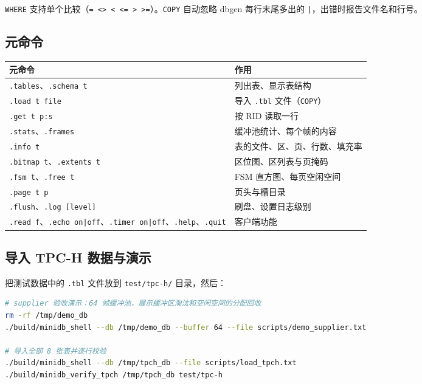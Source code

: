\documentclass[11pt,a4paper]{ctexart}
\newcommand{\code}[1]{\texttt{#1}}
\begin{document}
\code{WHERE} 支持单个比较（\code{= <> < <= > >=}）。\code{COPY} 自动忽略 dbgen 每行末尾多出的 \code{|}，出错时报告文件名和行号。

\subsection{元命令}

\begin{table}[H]
  \centering
  \small
  \begin{tabular}{l l}
    \toprule
    元命令 & 作用 \\
    \midrule
    \code{.tables}、\code{.schema t} & 列出表、显示表结构 \\
    \code{.load t file} & 导入 \code{.tbl} 文件（\code{COPY}） \\
    \code{.get t p:s} & 按 RID 读取一行 \\
    \code{.stats}、\code{.frames} & 缓冲池统计、每个帧的内容 \\
    \code{.info t} & 表的文件、区、页、行数、填充率 \\
    \code{.bitmap t}、\code{.extents t} & 区位图、区列表与页掩码 \\
    \code{.fsm t}、\code{.free t} & FSM 直方图、每页空闲空间 \\
    \code{.page t p} & 页头与槽目录 \\
    \code{.flush}、\code{.log [level]} & 刷盘、设置日志级别 \\
    \code{.read f}、\code{.echo on|off}、\code{.timer on|off}、\code{.help}、\code{.quit} & 客户端功能 \\
    \bottomrule
  \end{tabular}
\end{table}

\subsection{导入 TPC-H 数据与演示}

把测试数据中的 \code{.tbl} 文件放到 \code{test/tpc-h/} 目录，然后：

\begin{lstlisting}[language=bash,style=plain]
# supplier 验收演示：64 帧缓冲池，展示缓冲区淘汰和空闲空间的分配回收
rm -rf /tmp/demo_db
./build/minidb_shell --db /tmp/demo_db --buffer 64 --file scripts/demo_supplier.txt

# 导入全部 8 张表并逐行校验
./build/minidb_shell --db /tmp/tpch_db --file scripts/load_tpch.txt
./build/minidb_verify_tpch /tmp/tpch_db test/tpc-h
\end{lstlisting}
\end{document}
